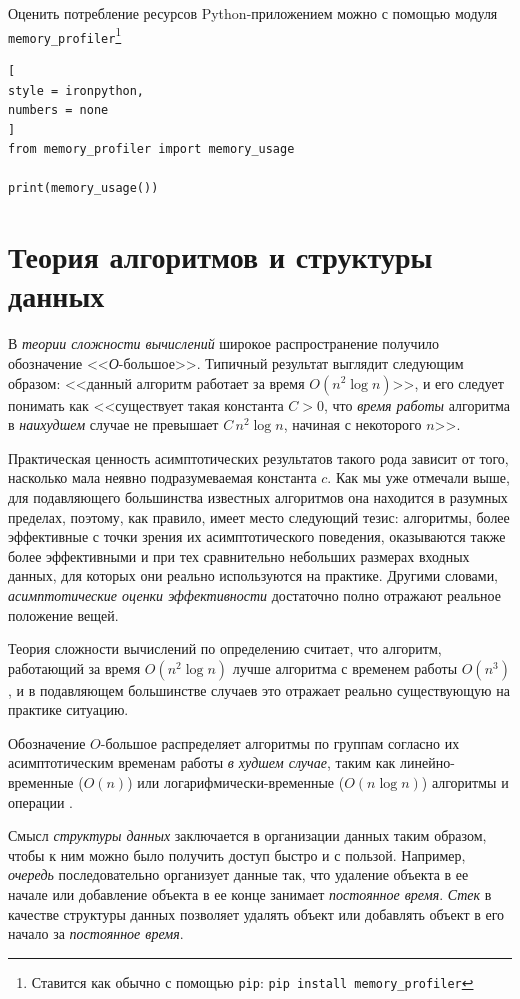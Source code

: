 \documentclass[%
	11pt,
	a4paper,
	utf8,
		]{article}
\begin{document}
Оценить потребление ресурсов Python-приложением можно с помощью модуля \texttt{memory\_profiler}\footnote{Ставится как обычно с помощью \texttt{pip}: \texttt{pip install memory\_profiler}}
\begin{lstlisting}[
style = ironpython,
numbers = none
]
from memory_profiler import memory_usage

print(memory_usage())
\end{lstlisting}

\section{Теория алгоритмов и структуры данных}

В \emph{теории сложности вычислений} широкое распространение получило обозначение <<\emph{О}-большое>>. Типичный результат выглядит следующим образом: <<данный алгоритм работает за время $ O(n^2 \log n) $>>, и его следует понимать как <<существует такая константа $ C > 0 $, что \emph{время работы} алгоритма в \emph{наихудшем} случае не превышает $ C\,n^2 \log n $, начиная с некоторого $ n $>>.

Практическая ценность асимптотических результатов такого рода зависит от того, насколько мала неявно подразумеваемая константа $ c $. Как мы уже отмечали выше, для подавляющего большинства известных алгоритмов она находится в разумных пределах, поэтому, как правило, имеет место следующий тезис: алгоритмы, более эффективные с точки зрения их асимптотического поведения, оказываются также более эффективными и при тех сравнительно небольших размерах входных данных, для которых они реально используются на практике. Другими словами, \emph{асимптотические оценки эффективности} достаточно полно отражают реальное положение вещей.

Теория сложности вычислений по определению считает, что алгоритм, работающий за время $ O(n^2 \log n) $ лучше алгоритма с временем работы $ O(n^3) $, и в подавляющем большинстве случаев это отражает реально существующую на практике ситуацию.

Обозначение $ O $-большое распределяет алгоритмы по группам согласно их асимптотическим временам работы \emph{в худшем случае}, таким как линейно-временные ($ O(n) $) или логарифмически-временные ($ O(n \log n) $) алгоритмы и операции \cite[246]{roughgarden-graph:2019}.

Смысл \emph{структуры данных} заключается в организации данных таким образом, чтобы к ним можно было получить доступ быстро и с пользой. Например, \emph{очередь} последовательно организует данные так, что удаление объекта в ее начале или добавление объекта в ее конце занимает \emph{постоянное время}. \emph{Стек} в качестве структуры данных позволяет удалять объект или добавлять объект в его начало за \emph{постоянное время}.
\end{document}
